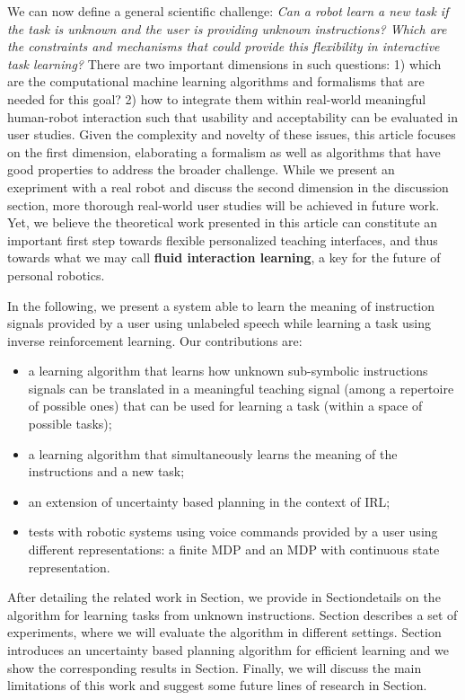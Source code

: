 We can now define a general scientific challenge: \textit{Can a robot learn a new task if the task is unknown and the user is providing unknown instructions? Which are the constraints and mechanisms that could provide this flexibility in interactive task learning?} There are two important dimensions in such questions: 1) which are the computational machine learning algorithms and formalisms that are needed for this goal? 2) how to integrate them within real-world meaningful human-robot interaction such that usability and acceptability can be evaluated in user studies. Given the complexity and novelty of these issues, this article focuses on the first dimension, elaborating a formalism as well as algorithms that have good properties to address the broader challenge. While we present an exepriment with a real robot and discuss the second dimension in the discussion section, more thorough real-world user studies will be achieved in future work. Yet, we believe the theoretical work presented in this article can constitute an important first step towards flexible personalized teaching interfaces, and thus towards what we may call \textbf{fluid interaction learning}, a key for the future of personal robotics.

In the following, we present a system able to learn the meaning of instruction signals provided by a user using unlabeled speech while learning a task using inverse reinforcement learning. Our contributions are:
\begin{itemize}
    \item a learning algorithm that learns how unknown sub-symbolic instructions signals can be translated in a meaningful teaching signal (among a repertoire of possible ones) that can be used for learning a task (within a space of possible tasks);
    \item a learning algorithm that simultaneously learns the meaning of the instructions and a new task;
    \item an extension of uncertainty based planning in the context of IRL;
    \item tests with robotic systems using voice commands provided by a user using different representations: a finite MDP and an MDP with continuous state representation.
\end{itemize}

After detailing the related work in Section, we provide in Sectiondetails on the algorithm for learning tasks from unknown instructions. Section describes a set of experiments, where we will evaluate the algorithm in different settings. Section introduces an uncertainty based planning algorithm for efficient learning and we show the corresponding results in Section. Finally, we will discuss the main limitations of this work and suggest some future lines of research in Section. 


